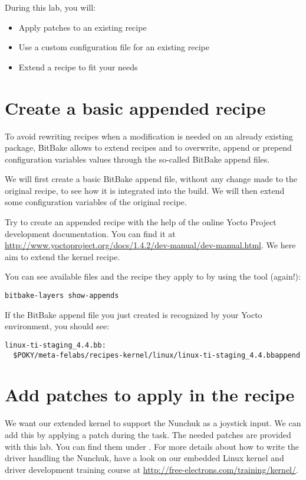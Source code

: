 
During this lab, you will:
\begin{itemize}
  \item Apply patches to an existing recipe
  \item Use a custom configuration file for an existing recipe
  \item Extend a recipe to fit your needs
\end{itemize}

\section{Create a basic appended recipe}

To avoid rewriting recipes when a modification is needed on an already existing
package, BitBake allows to extend recipes and to overwrite, append or prepend
configuration variables values through the so-called BitBake append files.

We will first create a basic BitBake append file, without any change made
to the original recipe, to see how it is integrated into the build. We will then
extend some configuration variables of the original recipe.

Try to create an appended recipe with the help of the online Yocto
Project development documentation. You can find it at
\url{http://www.yoctoproject.org/docs/1.4.2/dev-manual/dev-manual.html}. We here
aim to extend the  kernel recipe.

You can see available  files and the recipe they apply to by
using the  tool (again!):
\begin{verbatim}
bitbake-layers show-appends
\end{verbatim}

If the BitBake append file you just created is recognized by your Yocto
environment, you should see:
\begin{verbatim}
linux-ti-staging_4.4.bb:
  $POKY/meta-felabs/recipes-kernel/linux/linux-ti-staging_4.4.bbappend
\end{verbatim}

\section{Add patches to apply in the recipe}

We want our extended  kernel to support the Nunchuk as
a joystick input. We can add this by applying a patch during the
 task. The needed patches are provided with this lab. You can
find them under . For more details about
how to write the driver handling the Nunchuk, have a look on our embedded Linux
kernel and driver development training course at
\url{http://free-electrons.com/training/kernel/}.

